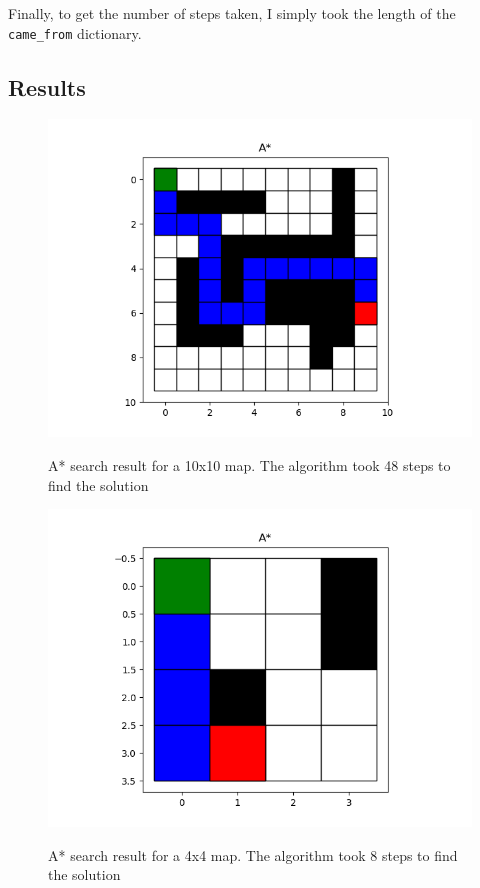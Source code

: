 \documentclass[journal]{IEEEtran}
\begin{document}
    Finally, to get the number of steps taken, I simply took the length of the \lstinline{came_from} dictionary.
    \subsection{Results}

    \begin{figure}[ht]
        \includegraphics[width=\linewidth]{figures/A_LargeMap_Path.png}
        \label{fig:Dijkstra_Weights_Example}
        \caption{A* search result for a 10x10 map. The algorithm took 48 steps to find the solution}
    \end{figure} 

    \begin{figure}[ht]
        \includegraphics[width=\linewidth]{figures/A_SmallMap_Path.png}
        \label{fig:Dijkstra_Weights_Example}
        \caption{A* search result for a 4x4 map. The algorithm took 8 steps to find the solution}
    \end{figure} 
    \newpage
    \printbibliography
\end{document}
